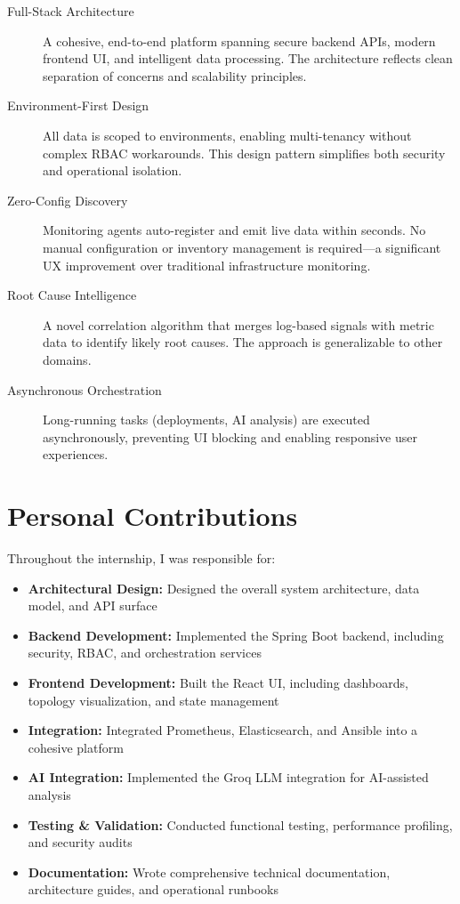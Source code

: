 \documentclass[12pt,a4paper]{report}
\begin{document}
\begin{description}
  \item[Full-Stack Architecture] A cohesive, end-to-end platform spanning secure backend APIs, modern frontend UI, and intelligent data processing. The architecture reflects clean separation of concerns and scalability principles.
  
  \item[Environment-First Design] All data is scoped to environments, enabling multi-tenancy without complex RBAC workarounds. This design pattern simplifies both security and operational isolation.
  
  \item[Zero-Config Discovery] Monitoring agents auto-register and emit live data within seconds. No manual configuration or inventory management is required—a significant UX improvement over traditional infrastructure monitoring.
  
  \item[Root Cause Intelligence] A novel correlation algorithm that merges log-based signals with metric data to identify likely root causes. The approach is generalizable to other domains.
  
  \item[Asynchronous Orchestration] Long-running tasks (deployments, AI analysis) are executed asynchronously, preventing UI blocking and enabling responsive user experiences.
\end{description}

\section*{Personal Contributions}

Throughout the internship, I was responsible for:

\begin{itemize}
  \item \textbf{Architectural Design:} Designed the overall system architecture, data model, and API surface
  \item \textbf{Backend Development:} Implemented the Spring Boot backend, including security, RBAC, and orchestration services
  \item \textbf{Frontend Development:} Built the React UI, including dashboards, topology visualization, and state management
  \item \textbf{Integration:} Integrated Prometheus, Elasticsearch, and Ansible into a cohesive platform
  \item \textbf{AI Integration:} Implemented the Groq LLM integration for AI-assisted analysis
  \item \textbf{Testing \& Validation:} Conducted functional testing, performance profiling, and security audits
  \item \textbf{Documentation:} Wrote comprehensive technical documentation, architecture guides, and operational runbooks
\end{itemize}
\end{document}
